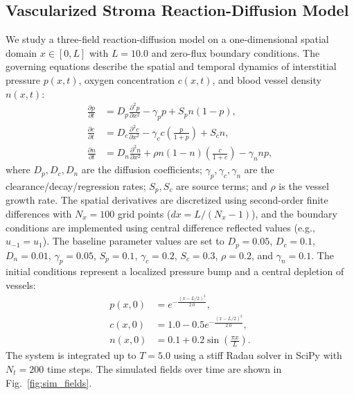 \documentclass[review,3p,times]{elsarticle}
\begin{document}
\subsection{Vascularized Stroma Reaction-Diffusion Model}
We study a three-field reaction-diffusion model on a one-dimensional spatial domain $x \in [0, L]$ with $L = 10.0$ and zero-flux boundary conditions. The governing equations describe the spatial and temporal dynamics of interstitial pressure $p(x,t)$, oxygen concentration $c(x,t)$, and blood vessel density $n(x,t)$:
\begin{align}
\frac{\partial p}{\partial t} &= D_p \frac{\partial^2 p}{\partial x^2} - \gamma_p p + S_p n (1 - p), \label{eq:p}\\
\frac{\partial c}{\partial t} &= D_c \frac{\partial^2 c}{\partial x^2} - \gamma_c c \left(\frac{p}{1 + p}\right) + S_c n, \label{eq:c}\\
\frac{\partial n}{\partial t} &= D_n \frac{\partial^2 n}{\partial x^2} + \rho n (1 - n) \left(\frac{c}{1 + c}\right) - \gamma_n n p, \label{eq:n}
\end{align}
where $D_p, D_c, D_n$ are the diffusion coefficients; $\gamma_p, \gamma_c, \gamma_n$ are the clearance/decay/regression rates; $S_p, S_c$ are source terms; and $\rho$ is the vessel growth rate. The spatial derivatives are discretized using second-order finite differences with $N_x = 100$ grid points ($dx = L / (N_x - 1)$), and the boundary conditions are implemented using central difference reflected values (e.g., $u_{-1} = u_1$). The baseline parameter values are set to $D_p = 0.05$, $D_c = 0.1$, $D_n = 0.01$, $\gamma_p = 0.05$, $S_p = 0.1$, $\gamma_c = 0.2$, $S_c = 0.3$, $\rho = 0.2$, and $\gamma_n = 0.1$. The initial conditions represent a localized pressure bump and a central depletion of vessels:
\begin{align*}
p(x,0) &= e^{-\frac{(x - L/2)^2}{2.0}}, \\
c(x,0) &= 1.0 - 0.5 e^{-\frac{(x - L/2)^2}{2.0}}, \\
n(x,0) &= 0.1 + 0.2 \sin\left(\frac{\pi x}{L}\right).
\end{align*}
The system is integrated up to $T = 5.0$ using a stiff Radau solver in SciPy with $N_t = 200$ time steps. The simulated fields over time are shown in Fig.~\ref{fig:sim_fields}.
\end{document}
